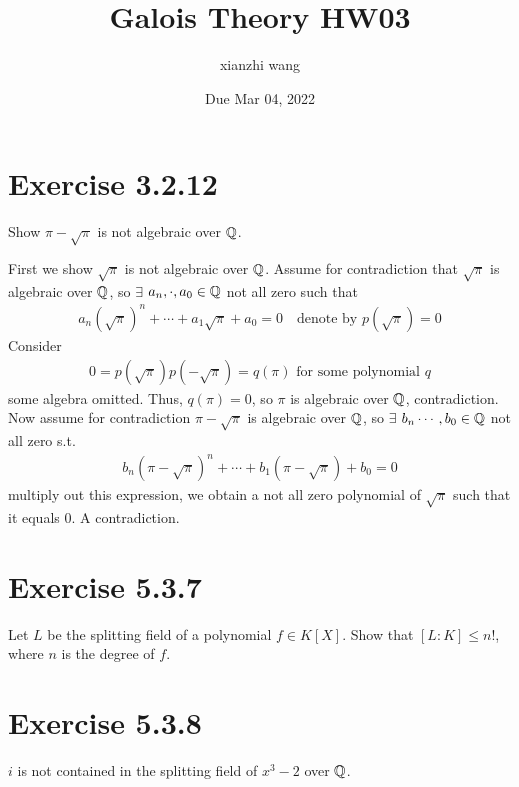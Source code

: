 \documentclass[12pt,english]{article}
\title{Galois Theory HW03}
\author{xianzhi wang}
\date{Due Mar 04, 2022}
\begin{document}
\maketitle

\section*{Exercise 3.2.12}
\begin{question}
Show $\pi - \sqrt{\pi}$ is not algebraic over $\mathbb{Q}$.
\end{question}

First we show $\sqrt{\pi}$ is not algebraic over $\mathbb{Q}$. Assume for contradiction that $\sqrt{\pi}$ is algebraic over $\mathbb{Q}$, so $\exists$ $a_n,\cdot, a_0\in \mathbb{Q}$ not all zero such that
\begin{align*}
    a_n(\sqrt{\pi})^n +\cdots+a_1 \sqrt{\pi} +a_0 = 0 \quad \text{denote by } p(\sqrt{\pi}) = 0
\end{align*}
Consider 
\begin{align*}
    0 = p(\sqrt{\pi})p(-\sqrt{\pi}) = q(\pi) \text{ for some polynomial } q
\end{align*} some algebra omitted.
Thus, $q(\pi) = 0$, so $\pi$ is algebraic over $\mathbb{Q}$, contradiction. \\

Now assume for contradiction $\pi-\sqrt{\pi}$ is algebraic over $\mathbb{Q}$, so $\exists$ $b_n \cdots, b_0 \in \mathbb{Q}$ not all zero s.t.
\begin{align*}
    b_n(\pi-\sqrt{\pi})^n+\cdots +b_1(\pi-\sqrt{\pi})+b_0 = 0
\end{align*} multiply out this expression, we obtain a not all zero polynomial of $\sqrt{\pi}$ such that it equals $0$. A contradiction. 


\section*{Exercise 5.3.7}
\begin{question}
    Let $L$ be the splitting field of a polynomial $f \in K[X].$ Show that $[L:K] \leq n!$, where $n$ is the degree of $f$.
\end{question}


\section*{Exercise 5.3.8}

$i$ is not contained in the splitting field of $x^3-2$ over $\mathbb{Q}$.\\
\end{document}
